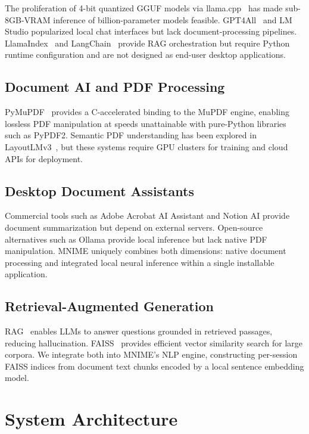 \documentclass[11pt]{article}
\begin{document}
The proliferation of 4-bit quantized GGUF models via
llama.cpp~\cite{llama_cpp2023} has made sub-8GB-VRAM inference of
billion-parameter models feasible.
GPT4All~\cite{anand2023gpt4all} and LM Studio popularized local chat
interfaces but lack document-processing pipelines.
LlamaIndex~\cite{liu2022llamaindex} and LangChain~\cite{chase2022langchain}
provide RAG orchestration but require Python runtime configuration and are
not designed as end-user desktop applications.

\subsection{Document AI and PDF Processing}

PyMuPDF~\cite{pymupdf2024} provides a C-accelerated binding to the MuPDF
engine, enabling lossless PDF manipulation at speeds unattainable with
pure-Python libraries such as PyPDF2.
Semantic PDF understanding has been explored in
LayoutLMv3~\cite{huang2022layoutlmv3}, but these systems require GPU clusters
for training and cloud APIs for deployment.

\subsection{Desktop Document Assistants}

Commercial tools such as Adobe Acrobat AI Assistant and Notion AI provide
document summarization but depend on external servers.
Open-source alternatives such as Ollama provide local inference but lack
native PDF manipulation.
MNIME uniquely combines both dimensions: native document processing and
integrated local neural inference within a single installable application.

\subsection{Retrieval-Augmented Generation}

RAG~\cite{lewis2020rag} enables LLMs to answer questions grounded in
retrieved passages, reducing hallucination.
FAISS~\cite{johnson2019faiss} provides efficient vector similarity search
for large corpora.
We integrate both into MNIME's NLP engine, constructing per-session FAISS
indices from document text chunks encoded by a local sentence embedding model.

\section{System Architecture}
\label{sec:system}
\end{document}

